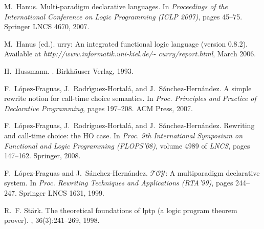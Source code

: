 \documentclass{llncs}
\begin{document}
\begin{thebibliography}{10}
M.~Hanus.
\newblock Multi-paradigm declarative languages.
\newblock In {\em Proceedings of the International Conference on Logic
  Programming (ICLP 2007)}, pages 45--75. Springer LNCS 4670, 2007.

M.~H{anus (ed.)}.
urry: An integrated functional logic language (version 0.8.2).
\newblock Available at {\it http://www.informatik.uni-kiel.de/\verb+~+}{\it
  curry/}{\it report.html}, March 2006.

H.~Hussmann.
.
\newblock Birkh\"auser Verlag, 1993.

F.~L{\'opez-Fraguas}, J.~R{odr\'{\i}guez-Hortal\'a}, and
  J.~S{\'anchez-Hern\'andez}.
\newblock A simple rewrite notion for call-time choice semantics.
\newblock In {\em Proc. Principles and Practice of Declarative Programming},
  pages 197--208. ACM Press, 2007.

F.~L{\'opez-Fraguas}, J.~R{odr\'iguez-Hortal\'a}, and
  J.~S{\'anchez-Hern\'andez}.
\newblock Rewriting and call-time choice: the {HO} case.
\newblock In {\em Proc. 9th International Symposium on Functional and Logic
  Programming (FLOPS'08)}, volume 4989 of {\em LNCS}, pages 147--162. Springer,
  2008.

F.~L{\'opez-Fraguas} and J.~S{\'anchez-Hern\'andez}.
\newblock $\mathcal{TOY}$: A multiparadigm declarative system.
\newblock In {\em Proc. Rewriting Techniques and Applications (RTA'99)}, pages
  244--247. Springer LNCS 1631, 1999.

R.~F. St{\"a}rk.
\newblock The theoretical foundations of lptp (a logic program theorem prover).
, 36(3):241--269, 1998.

\end{thebibliography}
\end{document}
